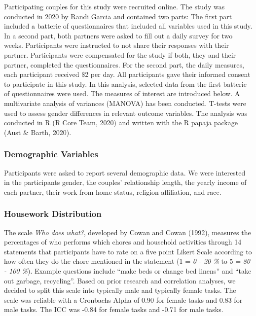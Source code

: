 \documentclass[
  man,floatsintext]{apa6}
\begin{document}
Participating couples for this study were recruited online. The study was conducted in 2020 by Randi Garcia and contained two parts: The first part included a batterie of questionnaires that included all variables used in this study. In a second part, both partners were asked to fill out a daily survey for two weeks. Participants were instructed to not share their responses with their partner. Participants were compensated for the study if both, they and their partner, completed the questionnaires. For the second part, the daily measures, each participant received \$2 per day. All participants gave their informed consent to participate in this study.
In this analysis, selected data from the first batterie of questionnaires were used. The measures of interest are introduced below.
A multivariate analysis of variances (MANOVA) has been conducted. T-tests were used to assess gender differences in relevant outcome variables.
The analysis was conducted in R (R Core Team, 2020) and written with the R papaja package (Aust \& Barth, 2020).

\hypertarget{demographic-variables}{%
\subsubsection{Demographic Variables}\label{demographic-variables}}

Participants were asked to report several demographic data. We were interested in the participants gender, the couples' relationship length, the yearly income of each partner, their work from home status, religion affiliation, and race.

\hypertarget{housework-distribution}{%
\subsubsection{Housework Distribution}\label{housework-distribution}}

The scale \emph{Who does what?}, developed by Cowan and Cowan (1992), measures the percentages of who performs which chores and household activities through 14 statements that participants have to rate on a five point Likert Scale according to how often they do the chore mentioned in the statement (1 = \emph{0 - 20 \%} to 5 = \emph{80 - 100 \%}). Example questions include ``make beds or change bed linens'' and ``take out garbage, recycling''. Based on prior research and correlation analyses, we decided to split this scale into typically male and typically female tasks. The scale was reliable with a Cronbachs Alpha of 0.90 for female tasks and 0.83 for male tasks. The ICC was -0.84 for female tasks and -0.71 for male tasks.
\end{document}
